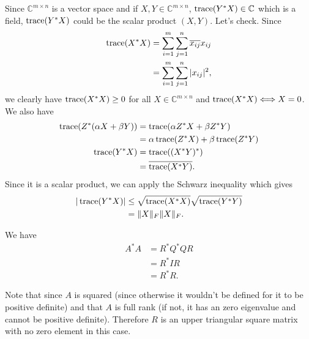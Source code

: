 \begin{solution}
  Since $\mathbb{C}^{m \times n}$ is a vector space and if $X,Y \in \mathbb{C}^{m \times n}$, $\operatorname{trace}(Y^*X) \in \mathbb{C}$ which is a field,
  $\operatorname{trace}(Y^*X)$ could be the scalar product $(X,Y)$.
  Let's check.
  Since
  \begin{align*}
    \operatorname{trace}(X^*X)
    & = \sum_{i = 1}^m \sum_{j = 1}^n \overline{x_{ij}}x_{ij}\\
    & = \sum_{i = 1}^m \sum_{j = 1}^n |x_{ij}|^2,
  \end{align*}
  we clearly have $\operatorname{trace}(X^*X) \geq 0$ for all $X \in \mathbb{C}^{m \times n}$ and
  $\operatorname{trace}(X^*X) \Longleftrightarrow X = 0$.
  We also have
  \begin{align*}
    \operatorname{trace}(Z^*(\alpha X + \beta Y))
    & = \operatorname{trace}(\alpha Z^*X + \beta Z^*Y)\\
    & = \alpha\operatorname{trace}(Z^*X) + \beta\operatorname{trace}(Z^*Y)\\
    \operatorname{trace}(Y^*X)
    & = \operatorname{trace}((X^*Y)^*)\\
    & = \overline{\operatorname{trace}(X^*Y)}.
  \end{align*}
  Since it is a scalar product, we can apply the Schwarz inequality which gives
  \begin{align*}
    |\operatorname{trace}(Y^*X)|
    & \leq \sqrt{\operatorname{trace}(X^*X)} \sqrt{\operatorname{trace}(Y^*Y)}\\
    & = \|X\|_F \|X\|_F.
  \end{align*}
\end{solution}

\begin{solution}
  We have
  \begin{align*}
    A^*A
    & = R^*Q^*QR\\
    & = R^*IR\\
    & = R^*R.
  \end{align*}

  Note that since $A$ is squared
  (since otherwise it wouldn't be defined for it to be positive definite)
  and that $A$ is full rank (if not, it has an zero eigenvalue and cannot be positive definite).
  Therefore $R$ is an upper triangular square matrix with no zero element in this case.
\end{solution}

